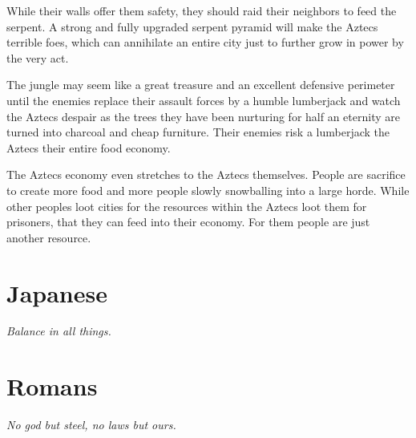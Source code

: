 \documentclass[a4paper]{book}
\begin{document}
		While their walls offer them safety, they should raid their neighbors to feed the serpent.
		A strong and fully upgraded serpent pyramid will make the \gls{Aztecs} terrible foes,
		which can annihilate an entire city just to further grow in power by the very act.

		The jungle may seem like a great treasure and an excellent defensive perimeter
		until the enemies replace their assault forces by a humble lumberjack
		and watch the \gls{Aztecs} despair as the trees they have been nurturing for half an eternity
		are turned into charcoal and cheap furniture.
		Their enemies risk a lumberjack the \gls{Aztecs} their entire food economy.

		The \gls{Aztecs} economy even stretches to the \gls{Aztecs} themselves.
		People are sacrifice to create more food and more people slowly snowballing into a large horde.
		While other peoples loot cities for the resources within the \gls{Aztecs} loot them
		for prisoners, that they can feed into their economy.
		For them people are just another resource.

\section{\Gls{Japanese}}

	\begin{flushright}
		\emph{Balance in all things.}
	\end{flushright}

\section{\Gls{Romans}}

	\begin{flushright}
		\emph{No god but steel, no laws but ours.}
	\end{flushright}
\end{document}

